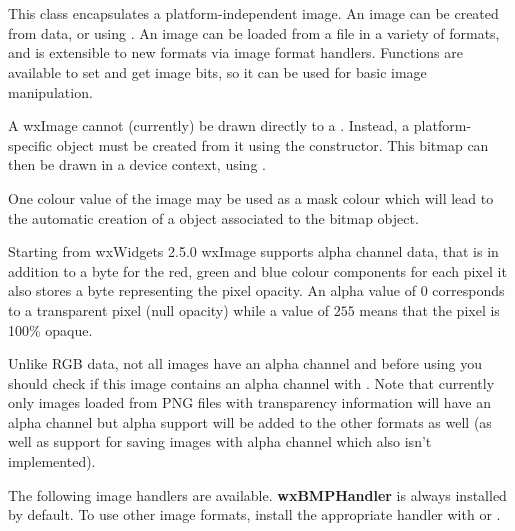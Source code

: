 \section{}\label{wximage}

This class encapsulates a platform-independent image. An image can be created
from data, or using . An image
can be loaded from a file in a variety of formats, and is extensible to new formats
via image format handlers. Functions are available to set and get image bits, so
it can be used for basic image manipulation.

A wxImage cannot (currently) be drawn directly to a . Instead, 
a platform-specific  object must be created from it using
the  constructor. 
This bitmap can then
be drawn in a device context, using .

One colour value of the image may be used as a mask colour which will lead to the automatic
creation of a  object associated to the bitmap object.


Starting from wxWidgets 2.5.0 wxImage supports alpha channel data, that is in
addition to a byte for the red, green and blue colour components for each pixel
it also stores a byte representing the pixel opacity. An alpha value of $0$
corresponds to a transparent pixel (null opacity) while a value of $255$
means that the pixel is 100\% opaque.

Unlike RGB data, not all images have an alpha channel and before using 
 you should check if this image contains
an alpha channel with . Note that currently only
images loaded from PNG files with transparency information will have an alpha
channel but alpha support will be added to the other formats as well (as well
as support for saving images with alpha channel which also isn't implemented).


The following image handlers are available. {\bf wxBMPHandler} is always
installed by default. To use other image formats, install the appropriate
handler with  or 
.

